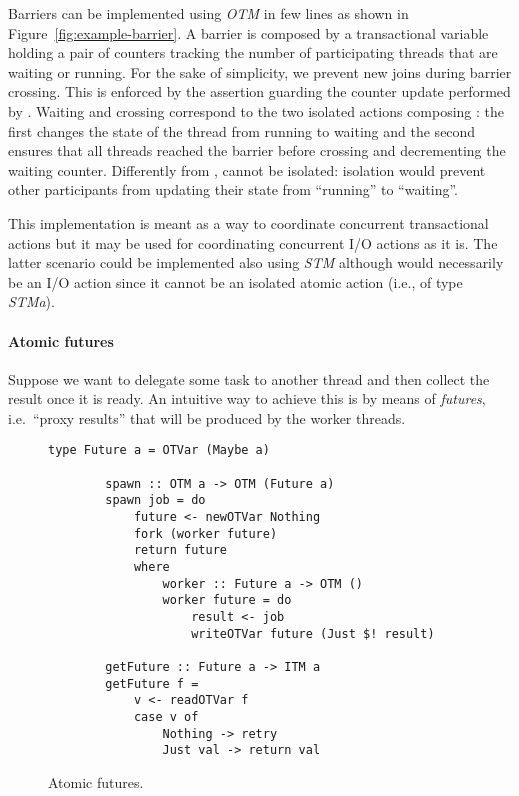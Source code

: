 Barriers can be implemented using \emph{OTM} in few lines as shown
in Figure~\ref{fig:example-barrier}. A barrier is composed by
a transactional variable holding a pair of counters 
tracking the number of participating threads that are waiting
or running. For the sake of simplicity, we prevent new joins 
during barrier crossing.
This is enforced by the assertion guarding the counter update
performed by . 
Waiting and crossing correspond to the two isolated actions composing
: the first changes the state of the thread from
running to waiting and the second ensures that all threads reached the barrier
before crossing and decrementing the waiting counter.
Differently from ,  cannot
be isolated: isolation would prevent other
participants from updating their state from ``running'' to ``waiting''.

This implementation is meant as a way to coordinate
concurrent transactional actions but it may be used
for coordinating concurrent I/O actions as it is.
The latter scenario could be implemented also using
\emph{STM} although  would necessarily
be an I/O action since it cannot be an
isolated atomic action (i.e., of type \emph{STM\;a}).

\paragraph{Atomic futures}
Suppose we want to delegate some task to another thread and 
then collect the result once it is ready. An intuitive way to 
achieve this is by means of \emph{futures}, i.e.~``proxy results'' 
that will be produced by the worker threads. 

\begin{figure}
    \centering
    \begin{Verbatim}[tabsize=3, gobble=2]
        type Future a = OTVar (Maybe a)
        
        spawn :: OTM a -> OTM (Future a)
        spawn job = do 
            future <- newOTVar Nothing
            fork (worker future)
            return future
            where
                worker :: Future a -> OTM ()
                worker future = do 
                    result <- job
                    writeOTVar future (Just $! result)
                    
        getFuture :: Future a -> ITM a
        getFuture f = 
            v <- readOTVar f
            case v of
                Nothing -> retry
                Just val -> return val        
    \end{Verbatim}
    \caption{Atomic futures.}%
    \vspace{-1ex}
    \label{fig:example-futures}
\end{figure}

